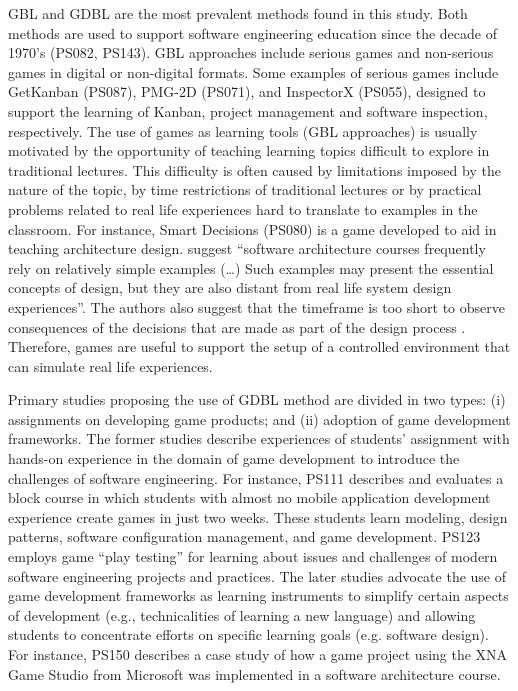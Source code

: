 GBL and GDBL are the most prevalent methods found in this study. Both methods are used to support software engineering education since the decade of 1970’s (PS082, PS143). GBL approaches include serious games and non-serious games in digital or non-digital formats. Some examples of serious games include GetKanban (PS087), PMG-2D (PS071), and InspectorX (PS055), designed to support the learning of Kanban, project management and software inspection, respectively. The use of games as learning tools (GBL approaches) is usually motivated by the opportunity of teaching learning topics difficult to explore in traditional lectures. This difficulty is often caused by limitations imposed by the nature of the topic, by time restrictions of traditional lectures or by practical problems related to real life experiences hard to translate to examples in the classroom. For instance, Smart Decisions (PS080) is a game developed to aid in teaching architecture design. \cite{Cervantes:2016} suggest “software architecture courses frequently rely on relatively simple examples (…) Such examples may present the essential concepts of design, but they are also distant from real life system design experiences”. The authors also suggest that the timeframe is too short to observe consequences of the decisions that are made as part of the design process \citep{Cervantes:2016}. Therefore, games are useful to support the setup of a controlled environment that can simulate real life experiences. 

Primary studies proposing the use of GDBL method are divided in two types: (i) assignments on developing game products; and (ii) adoption of game development frameworks. The former studies describe experiences of students’ assignment with hands-on experience in the domain of game development to introduce the challenges of software engineering. For instance, PS111 describes and evaluates a block course in which students with almost no mobile application development experience create games in just two weeks. These students learn modeling, design patterns, software configuration management, and game development. PS123 employs game “play testing” for learning about issues and challenges of modern software engineering projects and practices. The later studies advocate the use of game development frameworks as learning instruments to simplify certain aspects of development (e.g., technicalities of learning a new language) and allowing students to concentrate efforts on specific learning goals (e.g. software design). For instance, PS150 describes a case study of how a game project using the XNA Game Studio from Microsoft was implemented in a software architecture course.

